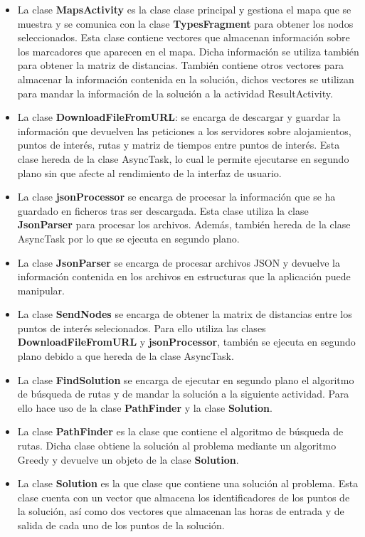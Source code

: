 \begin{itemize}
	\item La clase \textbf{MapsActivity} es la clase clase principal y gestiona el mapa que se muestra y se comunica con la clase \textbf{TypesFragment} para obtener los nodos seleccionados. Esta clase contiene vectores que almacenan información sobre los marcadores que aparecen en el mapa. Dicha información se utiliza también para obtener la matriz de distancias. También contiene otros vectores para almacenar la información contenida en la solución, dichos vectores se utilizan para mandar la información de la solución a la actividad ResultActivity.
	\item La clase \textbf{DownloadFileFromURL}: se encarga de descargar y guardar la información que devuelven las peticiones a los servidores sobre alojamientos, puntos de interés, rutas y matriz de tiempos entre puntos de interés. Esta clase hereda de la clase AsyncTask, lo cual le permite ejecutarse en segundo plano sin que afecte al rendimiento de la interfaz de usuario.
	\item La clase \textbf{jsonProcessor} se encarga de procesar la información que se ha guardado en ficheros tras ser descargada. Esta clase utiliza la clase \textbf{JsonParser} para procesar los archivos. Además, también hereda de la clase AsyncTask por lo que se ejecuta en segundo plano.
	\item La clase \textbf{JsonParser} se encarga de procesar archivos JSON y devuelve la información contenida en los archivos en estructuras que la aplicación puede manipular.
	\item La clase \textbf{SendNodes} se encarga de obtener la matrix de distancias entre los puntos de interés selecionados. Para ello utiliza las clases \textbf{DownloadFileFromURL} y\textbf{ jsonProcessor}, también se ejecuta en segundo plano debido a que hereda de la clase AsyncTask.
	\item La clase\textbf{ FindSolution} se encarga de ejecutar en segundo plano el algoritmo de búsqueda de rutas y de mandar la solución a la siguiente actividad. Para ello hace uso de la clase \textbf{PathFinder} y la clase \textbf{Solution}.
	\item La clase \textbf{PathFinder} es la clase que contiene el algoritmo de búsqueda de rutas. Dicha clase obtiene la solución al problema mediante un algoritmo Greedy y devuelve un objeto de la clase \textbf{Solution}.
	\item La clase \textbf{Solution} es la que clase que contiene una solución al problema. Esta clase cuenta con un vector que almacena los identificadores de los puntos de la solución, así como dos vectores que almacenan las horas de entrada y de salida de cada uno de los puntos de la solución.
\end{itemize}
